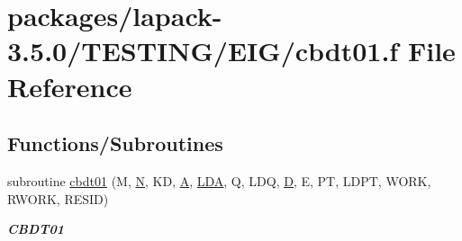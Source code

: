\hypertarget{cbdt01_8f}{}\section{packages/lapack-\/3.5.0/\+T\+E\+S\+T\+I\+N\+G/\+E\+I\+G/cbdt01.f File Reference}
\label{cbdt01_8f}
\subsection*{Functions/\+Subroutines}
\begin{DoxyCompactItemize}
\item 
subroutine \hyperlink{group__complex__eig_ga799e97bf0e79c0869e150c5de4e12e2a}{cbdt01} (M, \hyperlink{polmisc_8c_a0240ac851181b84ac374872dc5434ee4}{N}, K\+D, \hyperlink{classA}{A}, \hyperlink{example__user_8c_ae946da542ce0db94dced19b2ecefd1aa}{L\+D\+A}, Q, L\+D\+Q, \hyperlink{odrpack_8h_a7dae6ea403d00f3687f24a874e67d139}{D}, E, P\+T, L\+D\+P\+T, W\+O\+R\+K, R\+W\+O\+R\+K, R\+E\+S\+I\+D)
\begin{DoxyCompactList}\small\item\em {\bfseries C\+B\+D\+T01} \end{DoxyCompactList}\end{DoxyCompactItemize}
